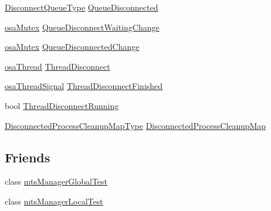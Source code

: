 \begin{DoxyCompactItemize}
\item 
\hyperlink{classmts_manager_global_a2513c197a42becaff9d23272f4a7be4b}{Disconnect\-Queue\-Type} \hyperlink{classmts_manager_global_a5dfcf8a628460bfcfa9350e15f8f36de}{Queue\-Disconnected}
\item 
\hyperlink{classosa_mutex}{osa\-Mutex} \hyperlink{classmts_manager_global_a900d74d93bb72e9420cd6094104c4c4e}{Queue\-Disconnect\-Waiting\-Change}
\item 
\hyperlink{classosa_mutex}{osa\-Mutex} \hyperlink{classmts_manager_global_aa4f774cb03c179504e84c3e5a36452b9}{Queue\-Disconnected\-Change}
\item 
\hyperlink{classosa_thread}{osa\-Thread} \hyperlink{classmts_manager_global_ac2dfc08c1931e1128145317e2499112f}{Thread\-Disconnect}
\item 
\hyperlink{classosa_thread_signal}{osa\-Thread\-Signal} \hyperlink{classmts_manager_global_a97940aadb7eeb7697a4174a929483def}{Thread\-Disconnect\-Finished}
\item 
bool \hyperlink{classmts_manager_global_a37a0b3f81f160ab240bb99924f52bf26}{Thread\-Disconnect\-Running}
\item 
\hyperlink{classmts_manager_global_a9df2055466c1e6a041ae3abc266fe507}{Disconnected\-Process\-Cleanup\-Map\-Type} \hyperlink{classmts_manager_global_ac3feb6deab8ad8d30b35000c776f4a9e}{Disconnected\-Process\-Cleanup\-Map}
\end{DoxyCompactItemize}
\subsection*{Friends}
\begin{DoxyCompactItemize}
\item 
class \hyperlink{classmts_manager_global_aad203c194c05c2d9063ff2face4590be}{mts\-Manager\-Global\-Test}
\item 
class \hyperlink{classmts_manager_global_adc2ae8db48d5418c526f275aafa3d4a9}{mts\-Manager\-Local\-Test}
\end{DoxyCompactItemize}


